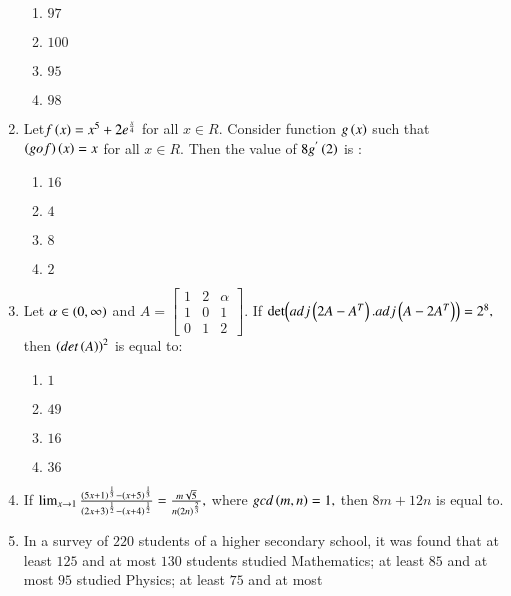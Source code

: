 \documentclass[journal]{IEEEtran}
\begin{document}
\begin{enumerate}[start=16]
\begin{multicols}{2}
    \begin{enumerate}
        \item $97$
        \item $100$
        \item $95$
        \item $98$
    \end{enumerate}
\end{multicols}
\bigskip
\item Let$f\left(x\right)=x^{5}+2e^{\frac{x}{4}}$ for all $x \in R.$ Consider function $g\left(x\right)$ such that $\left(gof\right)\left(x\right)=x$ for all $x \in R.$ Then the value of $8g^{'}\left(2\right)$ is :
\begin{multicols}{2}
    \begin{enumerate}
        \item $16$
        \item $4$
        \item $8$
        \item $2$
    \end{enumerate}
\end{multicols}
\bigskip
\item Let $\alpha \in \left(0,\infty\right)$ and $A = \begin{bmatrix} 
1 & 2 & \alpha \\ 
1 & 0 & 1 \\ 
0 & 1 & 2 
\end{bmatrix}.$ If $\text{det\ensuremath{\left(adj\left(2A-A^{T}\right).adj\left(A-2A^{T}\right)\right)}}=2^{8},$ then $\left(det\left(A\right)\right)^{2}$ is equal to:
\begin{multicols}{2}
    \begin{enumerate}
        \item $1$
        \item $49$
        \item $16$
        \item $36$
    \end{enumerate}
\end{multicols}
\bigskip
\item If $\lim_{x \to 1} \frac{\left(5x+1\right)^{\frac{1}{3}}-\left(x+5\right)^{\frac{1}{3}}}{\left(2x+3\right)^{\frac{1}{2}}-\left(x+4\right)^{\frac{1}{2}}}=\frac{m\sqrt{5}}{n\left(2n\right)^\frac{2}{3}},$ where $gcd\left(m,n\right)=1,$ then $8m+12n$ is equal to.
\bigskip
\item In a survey of $220$ students of a higher secondary
school, it was found that at least $125$ and at most
$130$ students studied Mathematics; at least $85$ and
at most $95$ studied Physics; at least $75$ and at most

\end{enumerate}
\end{document}
